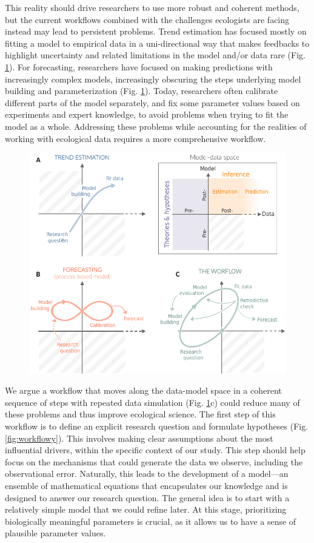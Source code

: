 \documentclass[11pt]{article}
\begin{document}
This reality should drive researchers to use more robust and coherent methods, but the current workflows combined with the challenges ecologists are facing instead may lead to persistent problems. 
Trend estimation has focused mostly on fitting a model to empirical data in a uni-directional way that makes feedbacks to highlight uncertainty and related limitations in the model and/or data rare (Fig. \ref{fig:modeldata}). For forecasting, researchers have focused on making predictions with increasingly complex models, increasingly obscuring the steps underlying model building and parameterization (Fig. \ref{fig:modeldata}). Today, researchers often calibrate different parts of the model separately, and fix some parameter values based on experiments and expert knowledge, to avoid problems when trying to fit the model as a whole. Addressing these problems while accounting for the realities of working with ecological data requires a more comprehensive workflow. 

\begin{figure}[h]
	\centering
	\includegraphics{figures/modeldataspaces}
	\caption{} 
	\label{fig:modeldata}
\end{figure}

We argue a workflow that moves along the data-model space in a coherent sequence of steps with repeated data simulation (Fig. \ref{fig:modeldata}c) could reduce many of these problems and thus improve ecological science.
The first step of this workflow is to define an explicit research question and formulate hypotheses (Fig. \ref{fig:workflowy}). This involves making clear assumptions about the most influential drivers, within the specific context of our study. This step should help focus on the mechanisms that could generate the data we observe, including the observational error. Naturally, this leads to the development of a model---an ensemble of mathematical equations that encapsulates our knowledge and is designed to answer our research question. The general idea is to start with a relatively simple model that we could refine later. At this stage, prioritizing biologically meaningful parameters is crucial, as it allows us to have a sense of plausible parameter values. 
\end{document}

